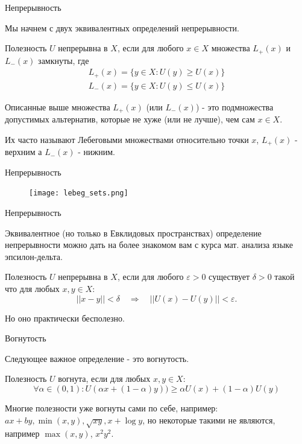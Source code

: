 \documentclass{beamer}
\begin{document}
\begin{frame}{Непрерывность}

Мы начнем с двух эквивалентных определений непрерывности.

\begin{definition}
Полезность $U$ \alert{непрерывна} в $X$, если для любого $x \in X$ множества $L_{+}(x)$ и $L_{-}(x)$ замкнуты, где
\begin{gather*} L_{+}(x) = \{y \in X: U(y) \geqslant U(x)\}\\
 L_{-}(x) = \{y \in X: U(y) \leqslant U(x)\}\end{gather*}
\end{definition}

Описанные выше множества $L_{+}(x)$ (или $L_{-}(x)$) - это подмножества допустимых альтернатив, которые не хуже (или не лучше), чем сам $x \in X$. 

Их часто называют \alert{Лебеговыми множествами} относительно точки $x$, $L_{+}(x)$ - верхним а $L_{-}(x)$ - нижним.

\end{frame}

\begin{frame}{Непрерывность}

\begin{figure}[hbt]
\centering
\texttt{[image: lebeg\_sets.png]}
\end{figure}

\end{frame}

\begin{frame}{Непрерывность}

Эквивалентное (но только в Евклидовых пространствах) определение непрерывности можно дать на более знакомом вам с курса мат. анализа языке эпсилон-дельта.

\begin{definition} Полезность $U$ \alert{непрерывна} в $X$, если для любого $\varepsilon > 0$ существует $\delta >0$ такой что для любых $x, y \in X$: $$ ||x - y|| < \delta \quad \Rightarrow \quad ||U(x) - U(y)|| < \varepsilon.$$	
\end{definition}

Но оно практически бесполезно.

\end{frame}

\begin{frame}{Вогнутость}

Следующее важное определение - это вогнутость.

\begin{definition}
Полезность $U$ \alert{вогнута}, если для любых $x, y \in X$: 
$$ \forall \alpha \in (0,1): U(\alpha x + (1-\alpha) y)) \geqslant \alpha U(x) + (1-\alpha) U(y)$$
\end{definition}

Многие полезности уже вогнуты сами по себе, например: $ax + by, \min(x,y), \sqrt{xy}, x + \log y$, но некоторые такими не являются, например $\max(x,y)$, $x^2y^2$.

\end{frame}
\end{document}
